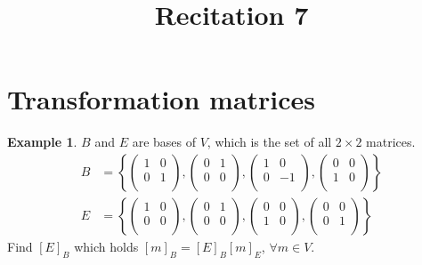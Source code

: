 \documentclass[fleqn, a4paper, 12pt]{article}
\title{Recitation 7}
\author{}
\date{\formatdate{10}{12}{2014}}
\theoremstyle{definition}
\newtheorem{example}{Example}
\theoremstyle{theorem}
\begin{document}
\maketitle

\tableofcontents

\newpage
\section{Transformation matrices}

\begin{example}
	$B$ and $E$ are bases of $V$, which is the set of all $2 \times 2$ matrices.
	\begin{align*}
		B &=
		\left\lbrace
		\begin{pmatrix}
			1 & 0\\
			0 & 1\\
		\end{pmatrix}
		,
		\begin{pmatrix}
			0 & 1\\
			0 & 0\\
		\end{pmatrix}
		,
		\begin{pmatrix}
			1 & 0\\
			0 & -1\\
		\end{pmatrix}
		,
		\begin{pmatrix}
			0 & 0\\
			1 & 0\\
		\end{pmatrix}
		\right\rbrace\\
		E &=
		\left\lbrace
		\begin{pmatrix}
		1 & 0\\
		0 & 0\\
		\end{pmatrix}
		,
		\begin{pmatrix}
		0 & 1\\
		0 & 0\\
		\end{pmatrix}
		,
		\begin{pmatrix}
		0 & 0\\
		1 & 0\\
		\end{pmatrix}
		,
		\begin{pmatrix}
		0 & 0\\
		0 & 1\\
		\end{pmatrix}
		\right\rbrace
	\end{align*}
	Find $[E]_B$ which holds $[m]_B = [E]_B [m]_E$, $\forall m \in V$.
\end{example}
\end{document}
